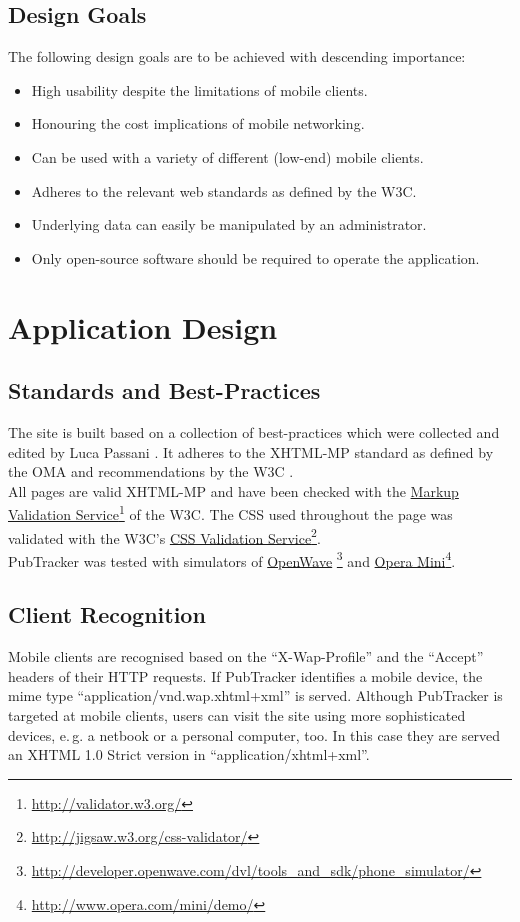 \documentclass[a4paper,10pt]{scrartcl}
\begin{document}
\subsection{Design Goals}
The following design goals are to be achieved with descending importance:
\begin{itemize}
	\item High usability despite the limitations of mobile clients.
	\item Honouring the cost implications of mobile networking.
	\item Can be used with a variety of different (low-end) mobile clients.
	\item Adheres to the relevant web standards as defined by the \ac{W3C}.
	\item Underlying data can easily be manipulated by an administrator.
 	\item Only open-source software should be required to operate the application.
\end{itemize}

\section{Application Design}
\subsection{Standards and Best-Practices}
The site is built based on a collection of best-practices which were collected
and edited by Luca Passani \cite{passani}. It adheres to the \ac{XHTML-MP}
standard as defined by  the \ac{OMA} and recommendations by the \ac{W3C}
\cite{oma:standard, w3c:recommendations}.\\
All pages are valid \ac{XHTML-MP} and have been checked with the
\href{http://validator.w3.org/}{Markup Validation
Service}\footnote{\url{http://validator.w3.org/}} of the \ac{W3C}. The \ac{CSS}
used throughout the page was validated with the \ac{W3C}'s \href{http://jigsaw.w3.org/css-validator/}{CSS Validation
Service}\footnote{\url{http://jigsaw.w3.org/css-validator/}}.\\
PubTracker was tested with simulators of
\href{http://developer.openwave.com/dvl/tools_and_sdk/phone_simulator/}{OpenWave}%
\footnote{\url{http://developer.openwave.com/dvl/tools_and_sdk/phone_simulator/}}
and \href{http://www.opera.com/mini/demo/}{Opera
Mini}\footnote{\url{http://www.opera.com/mini/demo/}}.

\subsection{Client Recognition}
Mobile clients are recognised based on the ``X-Wap-Profile'' and the ``Accept''
headers of their \ac{HTTP} requests. If PubTracker identifies a mobile
device, the mime type ``application/vnd.wap.xhtml+xml'' is served. Although
PubTracker is targeted at mobile clients, users can visit the site using more
sophisticated devices, e.\,g. a netbook or a personal computer, too. In this case
they are served an \ac{XHTML} 1.0 Strict version in ``application/xhtml+xml''.
\end{document}
